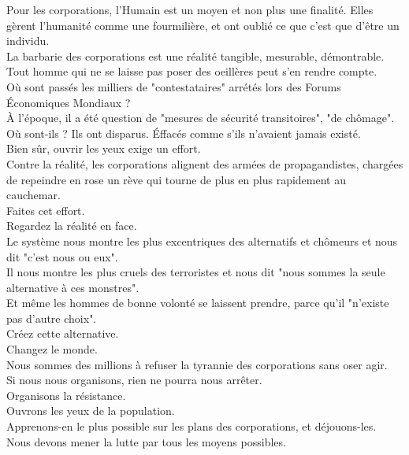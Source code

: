 \documentclass[11pt,twoside,a4paper]{article}
\begin{document}
\begin{multicols}{2}
Pour les corporations, l'Humain est un moyen et non plus une finalit{\'e}. Elles g{\`e}rent l'humanit{\'e} comme une fourmili{\`e}re, et ont oubli{\'e} ce que c'est que d'{\^e}tre un individu. ~\\ 

La barbarie des corporations est une r{\'e}alit{\'e} tangible, mesurable, d{\'e}montrable. ~\\
Tout homme qui ne se laisse pas poser des oeill{\`e}res peut s'en rendre compte. ~\\
O{\`u} sont pass{\'e}s les milliers de "contestataires" arr{\'e}t{\'e}s lors des Forums {\'E}conomiques Mondiaux ? ~\\ 
{\`A} l'{\'e}poque, il a {\'e}t{\'e} question de "mesures de s{\'e}curit{\'e} transitoires", "de ch{\^o}mage". ~\\ 
O{\`u} sont-ils ? Ils ont disparus. {\'E}ffac{\'e}s comme s'ils n'avaient jamais exist{\'e}. ~\\ 

Bien s{\^u}r, ouvrir les yeux exige un effort. ~\\
Contre la r{\'e}alit{\'e}, les corporations alignent des arm{\'e}es de propagandistes, charg{\'e}es de repeindre en rose un r{\`e}ve qui tourne de plus en plus rapidement au cauchemar. ~\\ 
Faites cet effort. ~\\ 
Regardez la r{\'e}alit{\'e} en face. ~\\

Le syst{\`e}me nous montre les plus excentriques des alternatifs et ch{\^o}meurs et nous dit "c'est nous ou eux". ~\\
Il nous montre les plus cruels des terroristes et nous dit "nous sommes la seule alternative {\`a} ces monstres". ~\\
Et m{\^e}me les hommes de bonne volont{\'e} se laissent prendre, parce qu'il "n'existe pas d'autre choix". ~\\

Cr{\'e}ez cette alternative. ~\\
Changez le monde. ~\\

Nous sommes des millions {\`a} refuser la tyrannie des corporations sans oser agir. ~\\
Si nous nous organisons, rien ne pourra nous arr{\^e}ter. ~\\

Organisons la r{\'e}sistance. ~\\
Ouvrons les yeux de la population. ~\\
Apprenons-en le plus possible sur les plans des corporations, et d{\'e}jouons-les. ~\\
Nous devons mener la lutte par tous les moyens possibles. ~\\


\end{multicols}
\end{document}
